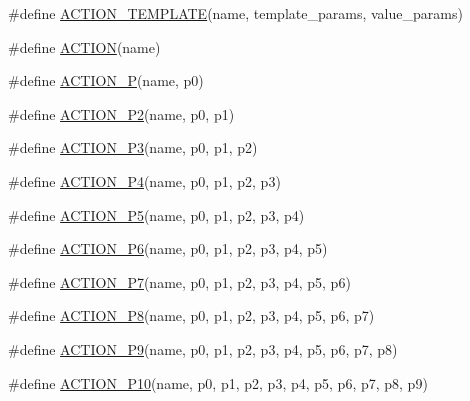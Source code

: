 \begin{DoxyCompactItemize}
\item 
\#define \mbox{\hyperlink{_obj__test_2lib_2googletest-master_2googlemock_2include_2gmock_2gmock-generated-actions_8h_ad04fa741f313f0c23924d61fcfb1536d}{A\+C\+T\+I\+O\+N\+\_\+\+T\+E\+M\+P\+L\+A\+TE}}(name,  template\+\_\+params,  value\+\_\+params)
\item 
\#define \mbox{\hyperlink{_obj__test_2lib_2googletest-master_2googlemock_2include_2gmock_2gmock-generated-actions_8h_a7af7137aa4871df4235881af377205fe}{A\+C\+T\+I\+ON}}(name)
\item 
\#define \mbox{\hyperlink{_obj__test_2lib_2googletest-master_2googlemock_2include_2gmock_2gmock-generated-actions_8h_a8ee9766f611f068271ca37a90c0e5960}{A\+C\+T\+I\+O\+N\+\_\+P}}(name,  p0)
\item 
\#define \mbox{\hyperlink{_obj__test_2lib_2googletest-master_2googlemock_2include_2gmock_2gmock-generated-actions_8h_a69fbf9ae696cc4cf779e22cb0960a067}{A\+C\+T\+I\+O\+N\+\_\+\+P2}}(name,  p0,  p1)
\item 
\#define \mbox{\hyperlink{_obj__test_2lib_2googletest-master_2googlemock_2include_2gmock_2gmock-generated-actions_8h_ab038de3f66ae709773473c18b6a43b29}{A\+C\+T\+I\+O\+N\+\_\+\+P3}}(name,  p0,  p1,  p2)
\item 
\#define \mbox{\hyperlink{_obj__test_2lib_2googletest-master_2googlemock_2include_2gmock_2gmock-generated-actions_8h_af416cf9b0288fce8b2c4b71e4df6cfc0}{A\+C\+T\+I\+O\+N\+\_\+\+P4}}(name,  p0,  p1,  p2,  p3)
\item 
\#define \mbox{\hyperlink{_obj__test_2lib_2googletest-master_2googlemock_2include_2gmock_2gmock-generated-actions_8h_ad0bb4c20795e7efe55b9b76f334554b2}{A\+C\+T\+I\+O\+N\+\_\+\+P5}}(name,  p0,  p1,  p2,  p3,  p4)
\item 
\#define \mbox{\hyperlink{_obj__test_2lib_2googletest-master_2googlemock_2include_2gmock_2gmock-generated-actions_8h_a3a8af72f23167873fcd5fc7476a4fabc}{A\+C\+T\+I\+O\+N\+\_\+\+P6}}(name,  p0,  p1,  p2,  p3,  p4,  p5)
\item 
\#define \mbox{\hyperlink{_obj__test_2lib_2googletest-master_2googlemock_2include_2gmock_2gmock-generated-actions_8h_a82d96846bae4fee8432385fd24b0a7ee}{A\+C\+T\+I\+O\+N\+\_\+\+P7}}(name,  p0,  p1,  p2,  p3,  p4,  p5,  p6)
\item 
\#define \mbox{\hyperlink{_obj__test_2lib_2googletest-master_2googlemock_2include_2gmock_2gmock-generated-actions_8h_a150147ecae8b84107be8575e4b2560cc}{A\+C\+T\+I\+O\+N\+\_\+\+P8}}(name,  p0,  p1,  p2,  p3,  p4,  p5,  p6,  p7)
\item 
\#define \mbox{\hyperlink{_obj__test_2lib_2googletest-master_2googlemock_2include_2gmock_2gmock-generated-actions_8h_a6a38804f2dce3fa758335676b4c26cda}{A\+C\+T\+I\+O\+N\+\_\+\+P9}}(name,  p0,  p1,  p2,  p3,  p4,  p5,  p6,  p7,  p8)
\item 
\#define \mbox{\hyperlink{_obj__test_2lib_2googletest-master_2googlemock_2include_2gmock_2gmock-generated-actions_8h_aff3ff3b23965dd03539aa4cbc5181002}{A\+C\+T\+I\+O\+N\+\_\+\+P10}}(name,  p0,  p1,  p2,  p3,  p4,  p5,  p6,  p7,  p8,  p9)
\end{DoxyCompactItemize}
